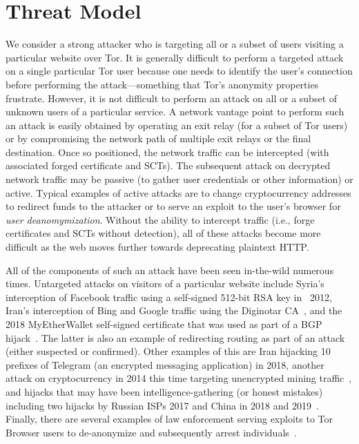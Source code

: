 \section{Threat Model} \label{sec:adversary}

We consider a strong attacker who is targeting all or a subset of users visiting
a particular website over Tor. It is generally difficult to perform a targeted
attack on a single particular Tor user because one needs to identify the user's
connection before performing the attack---something that Tor's
anonymity properties frustrate.
However, it is not difficult to perform an attack on all or a subset of unknown
users of a particular service. A network vantage point to perform such an attack
is easily obtained by operating an exit relay (for a subset of Tor users) or by
compromising the network path of multiple exit relays or the final destination.
Once so positioned, the network traffic can be intercepted (with associated
forged certificate and SCTs). The subsequent attack on decrypted network traffic
may be passive (to gather user credentials or other information) or active.
Typical examples of active attacks are to change cryptocurrency addresses to
redirect funds to the attacker or to serve an exploit to the user's browser for
\emph{user deanomymization}. Without the ability to intercept traffic (i.e.,
forge certificates and SCTs without detection), all of these attacks become more
difficult as the web moves further towards deprecating plaintext HTTP.

All of the components of such an attack have been seen in-the-wild numerous
times. Untargeted attacks on visitors of a particular website include Syria's
interception of Facebook traffic using a self-signed 512-bit RSA key in ~2012,
Iran's interception of Bing and Google traffic using the Diginotar
CA~\cite{diginotar}, and the 2018 MyEtherWallet self-signed certificate that was
used as part of a BGP hijack~\cite{myetherwallet}.  The latter is also an
example of redirecting routing as part of an attack (either suspected or
confirmed). Other examples of this are Iran hijacking 10 prefixes of Telegram
(an encrypted messaging application) in 2018, another attack on cryptocurrency
in 2014 this time targeting unencrypted mining
traffic~\cite{bgp-hijacking-for-crypto,bgp-hijacking-for-crypto-2}, and hijacks
that may have been intelligence-gathering (or honest mistakes) including two
hijacks by Russian ISPs 2017 and China in 2018 and 2019~\cite{wiki-bgp}.
Finally, there are several examples of law enforcement serving exploits to Tor
Browser users to de-anonymize and subsequently arrest
individuals~\cite{de-anonymize-exploit}.

